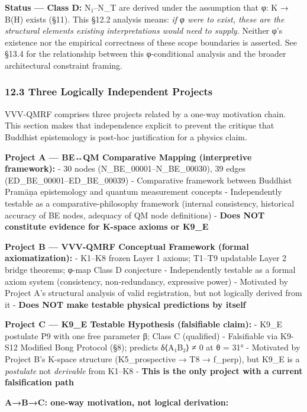 \documentclass[
  11pt,
]{article}
\begin{document}
\textbf{Status --- Class D:} N₁--N\_T are derived under the assumption
that φ: K → B(H) exists (§11). This §12.2 analysis means: \emph{if φ
were to exist, these are the structural elements existing
interpretations would need to supply.} Neither φ's existence nor the
empirical correctness of these scope boundaries is asserted. See §13.4
for the relationship between this φ-conditional analysis and the broader
architectural constraint framing.

\subsubsection{12.3 Three Logically Independent
Projects}\label{three-logically-independent-projects}

VVV-QMRF comprises three projects related by a one-way motivation chain.
This section makes that independence explicit to prevent the critique
that Buddhist epistemology is post-hoc justification for a physics
claim.

\textbf{Project A --- BE↔QM Comparative Mapping (interpretive
framework):} - 30 nodes (N\_BE\_00001--N\_BE\_00030), 39 edges
(ED\_BE\_00001--ED\_BE\_00039) - Comparative framework between Buddhist
Pramāṇa epistemology and quantum measurement concepts - Independently
testable as a comparative-philosophy framework (internal consistency,
historical accuracy of BE nodes, adequacy of QM node definitions) -
\textbf{Does NOT constitute evidence for K-space axioms or K9\_E}

\textbf{Project B --- VVV-QMRF Conceptual Framework (formal
axiomatization):} - K1--K8 frozen Layer 1 axioms; T1--T9 updatable Layer
2 bridge theorems; φ-map Class D conjecture - Independently testable as
a formal axiom system (consistency, non-redundancy, expressive power) -
Motivated by Project A's structural analysis of valid registration, but
not logically derived from it - \textbf{Does NOT make testable physical
predictions by itself}

\textbf{Project C --- K9\_E Testable Hypothesis (falsifiable claim):} -
K9\_E postulate P9 with one free parameter β; Class C (qualified) -
Falsifiable via K9-S12 Modified Bong Protocol (§8); predicts δ⟨A₁B₂⟩ ≠ 0
at θ = 31° - Motivated by Project B's K-space structure (K5\_prospective
→ T8 → f\_perp), but K9\_E is a \emph{postulate} not \emph{derivable}
from K1--K8 - \textbf{This is the only project with a current
falsification path}

\textbf{A→B→C: one-way motivation, not logical derivation:}
\end{document}
